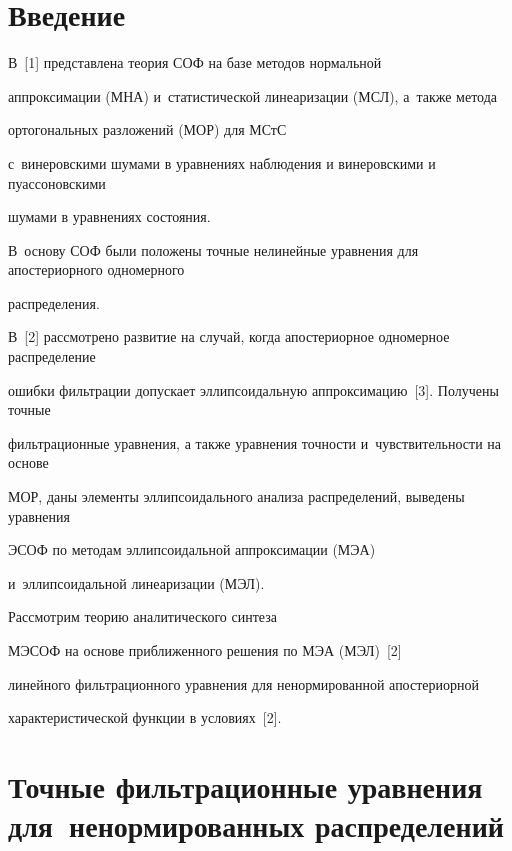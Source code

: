 \vspace*{-6pt}












      \thispagestyle{headings}



\section{Введение}



В~[1] представлена теория СОФ на базе методов нормальной 

аппроксимации (МНА) и~статистической линеаризации (МСЛ), а~также метода 

ортогональных разложений (МОР) для МСтС 

с~винеровскими шумами в уравнениях наблюдения и винеровскими и пуассоновскими 

шумами в уравнениях состояния.

В~основу СОФ были положены точные нелинейные уравнения для апостериорного одномерного 

распределения.



В~[2] рассмотрено развитие на случай, когда апостериорное одномерное распределение 

ошибки фильтрации допускает эллипсоидальную аппроксимацию~[3]. Получены точные 

фильтрационные уравнения, а также уравнения точности и~чувствительности на основе 

МОР, даны элементы эллипсоидального анализа распределений, выведены уравнения 

ЭСОФ по методам эллипсоидальной аппроксимации (МЭА) 

и~эллипсоидальной линеаризации (МЭЛ).



Рассмотрим теорию аналитического синтеза 

МЭСОФ на основе приближенного решения по МЭА (МЭЛ)~[2] 

линейного фильтрационного уравнения для ненормированной апостериорной 

характеристической функции в условиях~[2].



\section{Точные фильтрационные уравнения для~ненормированных распределений}





